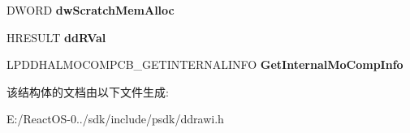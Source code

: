 \begin{DoxyCompactItemize}
D\+W\+O\+RD {\bfseries dw\+Scratch\+Mem\+Alloc}
\item 
\mbox{\label{struct___d_d_h_a_l___g_e_t_i_n_t_e_r_n_a_l_m_o_c_o_m_p_d_a_t_a_a6ff7398f94caddd703605e84570c2988}} 
H\+R\+E\+S\+U\+LT {\bfseries dd\+R\+Val}
\item 
\mbox{\label{struct___d_d_h_a_l___g_e_t_i_n_t_e_r_n_a_l_m_o_c_o_m_p_d_a_t_a_a23013fc32ac013f8179e907cb436a327}} 
L\+P\+D\+D\+H\+A\+L\+M\+O\+C\+O\+M\+P\+C\+B\+\_\+\+G\+E\+T\+I\+N\+T\+E\+R\+N\+A\+L\+I\+N\+FO {\bfseries Get\+Internal\+Mo\+Comp\+Info}
\end{DoxyCompactItemize}


该结构体的文档由以下文件生成\+:\begin{DoxyCompactItemize}
\item 
E\+:/\+React\+O\+S-\/0../sdk/include/psdk/ddrawi.\+h\end{DoxyCompactItemize}

